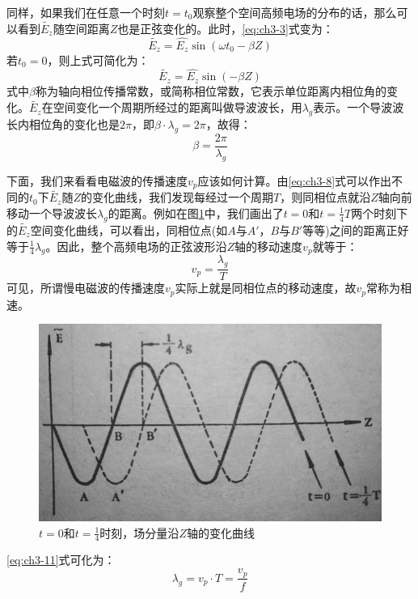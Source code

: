 同样，如果我们在任意一个时刻$ t=t_0 $观察整个空间高频电场的分布的话，那么可以看到$ \tilde{E_z} $随空间距离$ Z $也是正弦变化的。此时，\eqref{eq:ch3-3}式变为：
\begin{equation} \label{eq:ch3-8}
	\tilde{E_z} = \hat{E_z}\sin(\omega t_0 - \beta Z)
\end{equation}
若$ t_0 = 0 $，则上式可简化为：
\begin{equation} \label{eq:ch3-9}
\tilde{E_z} = \hat{E_z}\sin(- \beta Z)
\end{equation}
 式中$ \beta $称为轴向相位传播常数，或简称相位常数，它表示单位距离内相位角的变化。$ \tilde{E_z} $在空间变化一个周期所经过的距离叫做导波波长，用$ \lambda_g $表示。一个导波波长内相位角的变化也是$ 2\pi $，即$ \beta \cdot \lambda_g = 2\pi $，故得：
 \begin{equation} \label{eq:ch3-10}
 	\beta = \frac{2\pi}{\lambda_g}
 \end{equation}

下面，我们来看看电磁波的传播速度$ v_p $应该如何计算。由\eqref{eq:ch3-8}式可以作出不同的$ t_0 $下$ \tilde{E_z} $随$ Z $的变化曲线，我们发现每经过一个周期$ T $，则同相位点就沿$ Z $轴向前移动一个导波波长$ \lambda_g $的距离。例如在图\ref{ch3-3}中，我们画出了$ t=0 $和$ t=\frac{1}{4}T $两个时刻下的$ \tilde{E_z} $空间变化曲线，可以看出，同相位点(如$ A $与$ A' $，$ B $与$ B' $等等)之间的距离正好等于$ \frac{1}{4} \lambda_g$。因此，整个高频电场的正弦波形沿$ Z $轴的移动速度$ v_p $就等于：
\begin{equation} \label{eq:ch3-11}
	v_p = \frac{\lambda_g}{T}
\end{equation}
可见，所谓慢电磁波的传播速度$ v_p $实际上就是同相位点的移动速度，故$ v_p $常称为相速。

 \begin{figure}[phtb]
	\centering
	\includegraphics[width=0.5\linewidth]{figure/ch3-3}
	\caption{$ t=0 $和$ t=\frac{1}{4}$时刻，场分量沿$ Z $轴的变化曲线}
	\label{ch3-3}
\end{figure}

\eqref{eq:ch3-11}式可化为：
\begin{equation} \label{eq:ch3-12}
	\lambda_g = v_p \cdot T = \frac{v_p}{f}
\end{equation}

